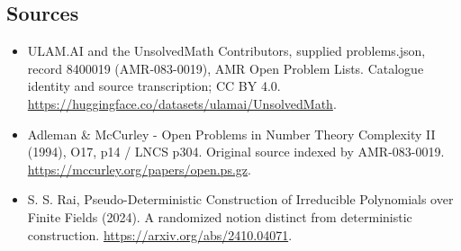 \documentclass[11pt,a4paper]{article}
\begin{document}
\subsection{Sources}
\begin{itemize}
\item[S1] ULAM.AI and the UnsolvedMath Contributors, supplied problems.json, record 8400019 (AMR-083-0019), AMR Open Problem Lists. Catalogue identity and source transcription; CC BY 4.0.
\url{https://huggingface.co/datasets/ulamai/UnsolvedMath}.
\item[S2] Adleman \& McCurley - Open Problems in Number Theory Complexity II (1994), O17, p14 / LNCS p304. Original source indexed by AMR-083-0019.
\url{https://mccurley.org/papers/open.ps.gz}.
\item[S3] S. S. Rai, Pseudo-Deterministic Construction of Irreducible Polynomials over Finite Fields (2024). A randomized notion distinct from deterministic construction.
\url{https://arxiv.org/abs/2410.04071}.
\end{itemize}
\end{document}
